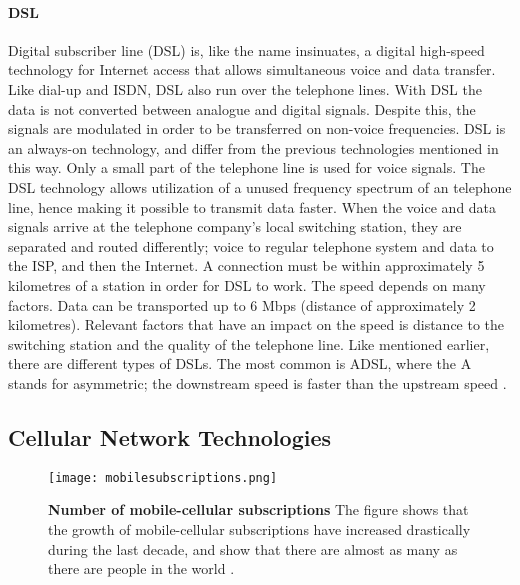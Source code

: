 \paragraph{DSL}
Digital subscriber line (DSL) is, like the name insinuates, a digital high-speed technology for Internet access that allows simultaneous voice and data transfer. Like dial-up and ISDN, DSL also run over the telephone lines. With DSL the data is not converted between analogue and digital signals. Despite this, the signals are modulated in order to be transferred on non-voice frequencies. DSL is an always-on technology, and differ from the previous technologies mentioned in this way. Only a small part of the telephone line is used for voice signals. The DSL technology allows utilization of a unused frequency spectrum of an telephone line, hence making it possible to transmit data faster. When the voice and data signals arrive at the telephone company's local switching station, they are separated and routed differently; voice to regular telephone system and data to the ISP, and then the Internet. A connection must be within approximately 5 kilometres of a station in order for DSL to work. The speed depends on many factors. Data can be transported up to 6 Mbps (distance of approximately 2 kilometres). Relevant factors that have an impact on the speed is distance to the switching station and the quality of the telephone line. Like mentioned earlier, there are different types of DSLs. The most common is ADSL, where the A stands for asymmetric; the downstream speed is faster than the upstream speed \cite{differentuplinks}.

\subsection{Cellular Network Technologies}

\begin{figure}[b]
  \centering
      \texttt{[image: mobilesubscriptions.png]}
  \caption [Number of mobile-cellular subscriptions]{\textbf{Number of mobile-cellular subscriptions} The figure shows that the growth of mobile-cellular subscriptions have increased drastically during the last decade, and show that there are almost as many as there are people in the world \cite{itu2013}.}
  \label{fig:subscribers}
\end{figure}

